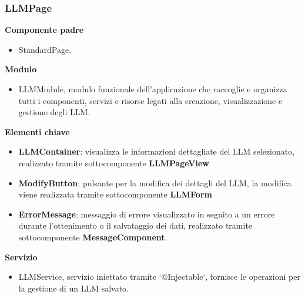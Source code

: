 \subsubsection{LLMPage}
\textbf{Componente padre}
\begin{itemize}
    \item StandardPage.
\end{itemize}
\textbf{Modulo}
\begin{itemize}
    \item LLMModule, modulo funzionale dell'applicazione che raccoglie e organizza tutti i componenti, servizi e risorse legati alla creazione, visualizzazione e gestione degli LLM.
\end{itemize}
\textbf{Elementi chiave}
\begin{itemize}
    \item \textbf{LLMContainer}: visualizza le informazioni dettagliate del LLM selezionato, realizzato tramite sottocomponente \textbf{LLMPageView} 
    \item \textbf{ModifyButton}: pulsante per la modifica dei dettagli del LLM, la modifica viene realizzata tramite sottocomponente \textbf{LLMForm}  
    \item \textbf{ErrorMessage}: messaggio di errore visualizzato in seguito a un errore durante l'ottenimento o il salvataggio dei dati, realizzato tramite sottocomponente \textbf{MessageComponent}.
\end{itemize}
\textbf{Servizio}
\begin{itemize}
    \item LLMService, servizio iniettato tramite `@Injectable`, fornisce le operazioni per la gestione di un LLM salvato.
\end{itemize}
